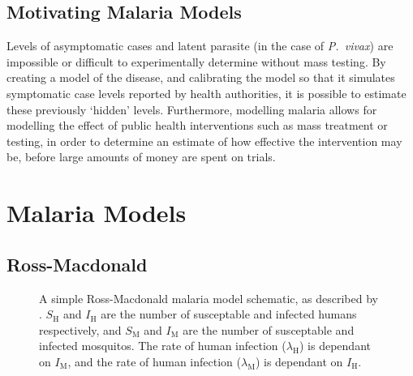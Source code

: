 \subsection*{Motivating Malaria Models}

Levels of asymptomatic cases and latent parasite (in the case of
\textit{P.\ vivax}) are impossible or difficult to experimentally determine
without mass testing. By creating a model of the disease, and calibrating the
model so that it simulates symptomatic case levels reported by health
authorities, it is possible to estimate these previously `hidden' levels.
Furthermore, modelling malaria allows for modelling the effect of public health
interventions such as mass treatment or testing, in order to determine an
estimate of how effective the intervention may be, before large amounts of
money are spent on trials.

\section{Malaria Models}

\subsection*{Ross-Macdonald}

\begin{figure}[htbp]
    \centering
    \caption{
        A simple Ross-Macdonald malaria model schematic, as described by
        \cite{aron_population_1982}. $S_\mathrm{H}$ and $I_\mathrm{H}$ are the
        number of susceptable and infected humans respectively, and
        $S_\mathrm{M}$ and $I_\mathrm{M}$ are the number of susceptable and
        infected mosquitos. The rate of human infection ($\lambda_\mathrm{H}$)
        is dependant on $I_\mathrm{M}$, and the rate of human infection
        ($\lambda_\mathrm{M}$) is dependant on $I_\mathrm{H}$.
    }
    \label{fig:ross_mac}
\end{figure}

